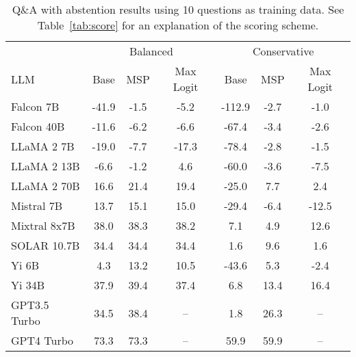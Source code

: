 \begin{table*}[h]
\centering
\caption{Q\&A with abstention results using 10 questions as training data. See Table~\ref{tab:score} for an explanation of the scoring scheme.}
\label{tab:score_k=10}
\begin{tabular}{lcccccc}
\toprule
& \multicolumn{3}{c}{Balanced} & \multicolumn{3}{c}{Conservative} \\ 
LLM & Base & MSP & Max Logit & Base & MSP & Max Logit \\ 
\cmidrule(lr){1-1}\cmidrule(lr){2-4}\cmidrule(lr){5-7} 
Falcon 7B & -41.9 & -1.5 & -5.2 & -112.9 & -2.7 & -1.0\\
Falcon 40B & -11.6 & -6.2 & -6.6 & -67.4 & -3.4 & -2.6\\
LLaMA 2 7B & -19.0 & -7.7 & -17.3 & -78.4 & -2.8 & -1.5\\
LLaMA 2 13B & -6.6 & -1.2 & 4.6 & -60.0 & -3.6 & -7.5\\
LLaMA 2 70B & 16.6 & 21.4 & 19.4 & -25.0 & 7.7 & 2.4\\
Mistral 7B & 13.7 & 15.1 & 15.0 & -29.4 & -6.4 & -12.5\\
Mixtral 8x7B & 38.0 & 38.3 & 38.2 & 7.1 & 4.9 & 12.6\\
SOLAR 10.7B & 34.4 & 34.4 & 34.4 & 1.6 & 9.6 & 1.6\\
Yi 6B & 4.3 & 13.2 & 10.5 & -43.6 & 5.3 & -2.4\\
Yi 34B & 37.9 & 39.4 & 37.4 & 6.8 & 13.4 & 16.4\\
GPT3.5 Turbo & 34.5 & 38.4 & -- & 1.8 & 26.3 & --\\
GPT4 Turbo & 73.3 & 73.3 & -- & 59.9 & 59.9 & --\\
\bottomrule
\end{tabular}
\end{table*}
